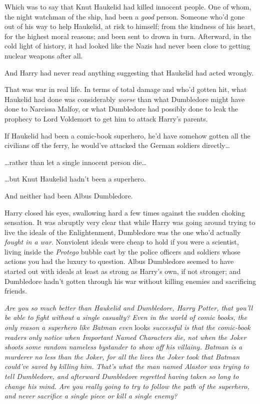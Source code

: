 Which was to say that Knut Haukelid had killed innocent people. One of whom,
the night watchman of the ship, had been a \emph{good} person. Someone who'd
gone out of his way to help Haukelid, at risk to himself; from the kindness of
his heart, for the highest moral reasons; and been sent to drown in turn.
Afterward, in the cold light of history, it had looked like the Nazis had never
been close to getting nuclear weapons after all.

And Harry had never read anything suggesting that Haukelid had acted wrongly.

That was war in real life. In terms of total damage and who'd gotten hit, what
Haukelid had done was considerably \emph{worse} than what Dumbledore might have
done to Narcissa Malfoy, or what Dumbledore had possibly done to leak the
prophecy to Lord Voldemort to get him to attack Harry's parents.

If Haukelid had been a comic-book superhero, he'd have somehow gotten all the
civilians off the ferry, he would've attacked the German soldiers
directly{\ldots}

{\ldots}rather than let a single innocent person die{\ldots}

{\ldots}but Knut Haukelid hadn't been a superhero.

And neither had been Albus Dumbledore.

Harry closed his eyes, swallowing hard a few times against the sudden choking
sensation. It was abruptly very clear that while Harry was going around trying
to live the ideals of the Enlightenment, Dumbledore was the one who'd actually
\emph{fought in a war}. Nonviolent ideals were cheap to hold if you were a
scientist, living inside the \emph{Protego} bubble cast by the police officers
and soldiers whose actions you had the luxury to question. Albus Dumbledore
seemed to have started out with ideals at least as strong as Harry's own, if
not stronger; and Dumbledore hadn't gotten through his war without killing
enemies and sacrificing friends.

\emph{Are you so much better than Haukelid and Dumbledore, Harry Potter, that
you'll be able to fight without a single casualty? Even in the world of comic
books, the only reason a superhero like Batman even} looks \emph{successful is
that the comic-book readers only notice when Important Named Characters die,
not when the Joker shoots some random nameless bystander to show off his
villainy. Batman is a murderer no less than the Joker, for all the lives the
Joker took that Batman could've saved by killing him. That's what the man named
Alastor was trying to tell Dumbledore, and afterward Dumbledore regretted
having taken so long to change his mind. Are you really going to try to follow
the path of the superhero, and never sacrifice a single piece or kill a single
enemy?}

